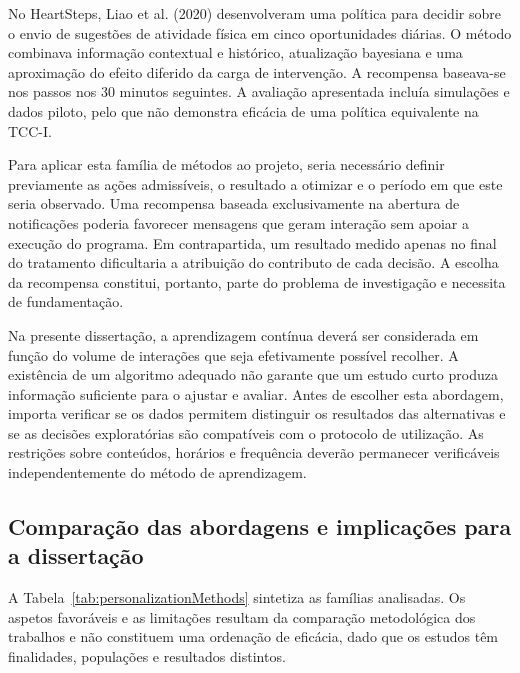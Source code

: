 No HeartSteps, Liao et al. (2020) desenvolveram uma política para decidir sobre o envio de sugestões de atividade física em cinco oportunidades diárias. O método combinava informação contextual e histórico, atualização bayesiana e uma aproximação do efeito diferido da carga de intervenção. A recompensa baseava-se nos passos nos 30 minutos seguintes. A avaliação apresentada incluía simulações e dados piloto, pelo que não demonstra eficácia de uma política equivalente na TCC-I.

Para aplicar esta família de métodos ao projeto, seria necessário definir previamente as ações admissíveis, o resultado a otimizar e o período em que este seria observado. Uma recompensa baseada exclusivamente na abertura de notificações poderia favorecer mensagens que geram interação sem apoiar a execução do programa. Em contrapartida, um resultado medido apenas no final do tratamento dificultaria a atribuição do contributo de cada decisão. A escolha da recompensa constitui, portanto, parte do problema de investigação e necessita de fundamentação.

Na presente dissertação, a aprendizagem contínua deverá ser considerada em função do volume de interações que seja efetivamente possível recolher. A existência de um algoritmo adequado não garante que um estudo curto produza informação suficiente para o ajustar e avaliar. Antes de escolher esta abordagem, importa verificar se os dados permitem distinguir os resultados das alternativas e se as decisões exploratórias são compatíveis com o protocolo de utilização. As restrições sobre conteúdos, horários e frequência deverão permanecer verificáveis independentemente do método de aprendizagem.

\subsection{Comparação das abordagens e implicações para a dissertação}
\label{sec:chap3_personalizationSynthesis}

A Tabela~\ref{tab:personalizationMethods} sintetiza as famílias analisadas. Os aspetos favoráveis e as limitações resultam da comparação metodológica dos trabalhos e não constituem uma ordenação de eficácia, dado que os estudos têm finalidades, populações e resultados distintos.


